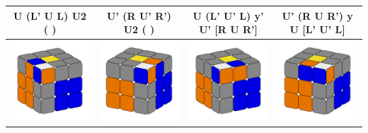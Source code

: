\documentclass[12pt, a3paper]{article}
\newcommand{\scale}{1}
\begin{document}
\begin{center}
\begin{longtable}{c|c||c|c}
	U (L' U L) U2 ( ) & U' (R U' R') U2 ( ) & U (L' U' L) y' U' [R U R'] & U' (R U R') y U [L' U' L] \\
	\hline
	\hline
	\includegraphics[scale=\scale]{11_left} & \includegraphics[scale=\scale]{11_right}  &  \includegraphics[scale=\scale]{12_left} & \includegraphics[scale=\scale]{12_right} \\

\end{longtable}
\end{center}
\end{document}
